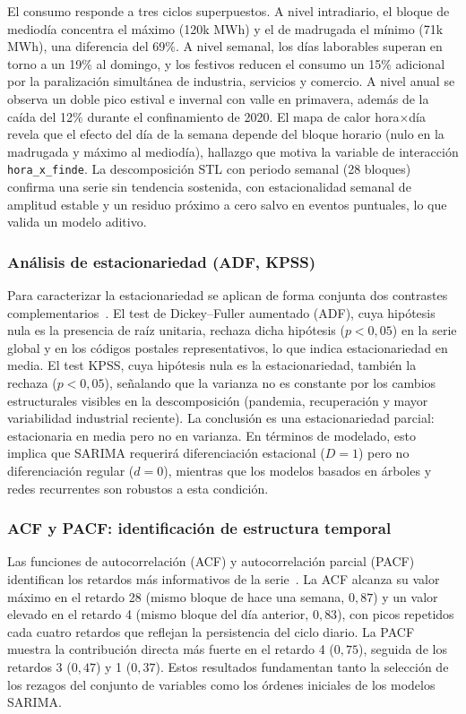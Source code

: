\documentclass[12pt, a4paper]{article}
\begin{document}
El consumo responde a tres ciclos superpuestos. A nivel intradiario, el bloque de mediodía concentra el máximo (120k MWh) y el de madrugada el mínimo (71k MWh), una diferencia del 69\%. A nivel semanal, los días laborables superan en torno a un 19\% al domingo, y los festivos reducen el consumo un 15\% adicional por la paralización simultánea de industria, servicios y comercio. A nivel anual se observa un doble pico estival e invernal con valle en primavera, además de la caída del 12\% durante el confinamiento de 2020. El mapa de calor hora$\times$día revela que el efecto del día de la semana depende del bloque horario (nulo en la madrugada y máximo al mediodía), hallazgo que motiva la variable de interacción \texttt{hora\_x\_finde}. La descomposición STL con periodo semanal (28 bloques) confirma una serie sin tendencia sostenida, con estacionalidad semanal de amplitud estable y un residuo próximo a cero salvo en eventos puntuales, lo que valida un modelo aditivo.

\subsubsection{Análisis de estacionariedad (ADF, KPSS)}

Para caracterizar la estacionariedad se aplican de forma conjunta dos contrastes complementarios~\cite{hyndman2021}. El test de Dickey--Fuller aumentado (ADF), cuya hipótesis nula es la presencia de raíz unitaria, rechaza dicha hipótesis ($p<0{,}05$) en la serie global y en los códigos postales representativos, lo que indica estacionariedad en media. El test KPSS, cuya hipótesis nula es la estacionariedad, también la rechaza ($p<0{,}05$), señalando que la varianza no es constante por los cambios estructurales visibles en la descomposición (pandemia, recuperación y mayor variabilidad industrial reciente). La conclusión es una estacionariedad parcial: estacionaria en media pero no en varianza. En términos de modelado, esto implica que SARIMA requerirá diferenciación estacional ($D=1$) pero no diferenciación regular ($d=0$), mientras que los modelos basados en árboles y redes recurrentes son robustos a esta condición.

\subsubsection{ACF y PACF: identificación de estructura temporal}

Las funciones de autocorrelación (ACF) y autocorrelación parcial (PACF) identifican los retardos más informativos de la serie~\cite{hyndman2021, boxjenkins2015}. La ACF alcanza su valor máximo en el retardo 28 (mismo bloque de hace una semana, $0{,}87$) y un valor elevado en el retardo 4 (mismo bloque del día anterior, $0{,}83$), con picos repetidos cada cuatro retardos que reflejan la persistencia del ciclo diario. La PACF muestra la contribución directa más fuerte en el retardo 4 ($0{,}75$), seguida de los retardos 3 ($0{,}47$) y 1 ($0{,}37$). Estos resultados fundamentan tanto la selección de los rezagos del conjunto de variables como los órdenes iniciales de los modelos SARIMA.
\end{document}
